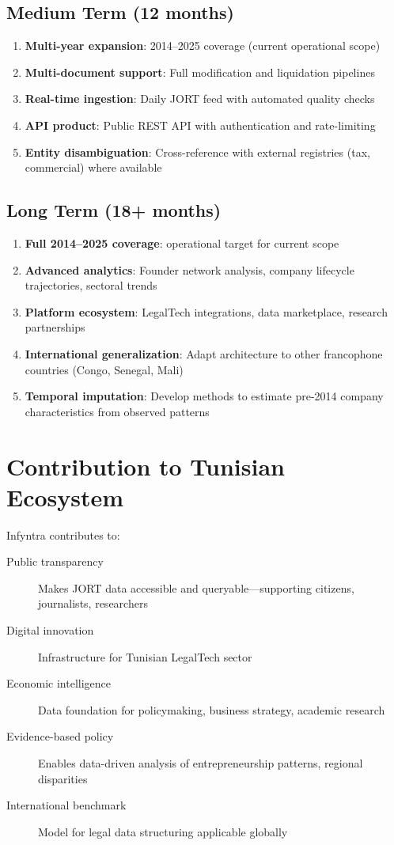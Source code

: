 \documentclass[12pt,a4paper]{report}
\begin{document}
\subsection{Medium Term (12 months)}

\begin{enumerate}
    \item \textbf{Multi-year expansion}: 2014--2025 coverage (current operational scope)
    \item \textbf{Multi-document support}: Full modification and liquidation pipelines
    \item \textbf{Real-time ingestion}: Daily JORT feed with automated quality checks
    \item \textbf{API product}: Public REST API with authentication and rate-limiting
    \item \textbf{Entity disambiguation}: Cross-reference with external registries (tax, commercial) where available
\end{enumerate}

\subsection{Long Term (18+ months)}

\begin{enumerate}
    \item \textbf{Full 2014--2025 coverage}: operational target for current scope
    \item \textbf{Advanced analytics}: Founder network analysis, company lifecycle trajectories, sectoral trends
    \item \textbf{Platform ecosystem}: LegalTech integrations, data marketplace, research partnerships
    \item \textbf{International generalization}: Adapt architecture to other francophone countries (Congo, Senegal, Mali)
    \item \textbf{Temporal imputation}: Develop methods to estimate pre-2014 company characteristics from observed patterns
\end{enumerate}

\section{Contribution to Tunisian Ecosystem}

Infyntra contributes to:

\begin{description}
    \item[Public transparency] Makes JORT data accessible and queryable—supporting citizens, journalists, researchers
    \item[Digital innovation] Infrastructure for Tunisian LegalTech sector
    \item[Economic intelligence] Data foundation for policymaking, business strategy, academic research
    \item[Evidence-based policy] Enables data-driven analysis of entrepreneurship patterns, regional disparities
    \item[International benchmark] Model for legal data structuring applicable globally
\end{description}
\end{document}
